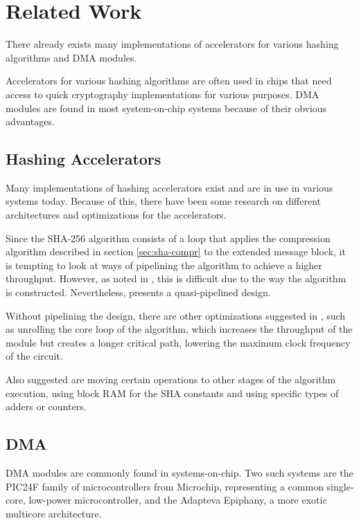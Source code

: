 \chapter{Related Work}

There already exists many implementations of accelerators for various hashing
algorithms and DMA modules.

Accelerators for various hashing algorithms are often used in chips that need
access to quick cryptography implementations for various purposes. DMA modules are
found in most system-on-chip systems because of their obvious advantages.

\section{Hashing Accelerators}
\label{sec:previous-hash}
Many implementations of hashing accelerators exist and are in use in various
systems today. Because of this, there have been some research on different
architectures and optimizations for the accelerators.

Since the SHA-256 algorithm consists of a loop that applies the compression
algorithm described in section \ref{sec:sha-compr} to the extended message
block, it is tempting to look at ways of pipelining the algorithm to achieve
a higher throughput. However, as noted in \cite{sha-opt}, this is difficult
due to the way the algorithm is constructed. Nevertheless, \cite{dadda-sha}
presents a quasi-pipelined design.

Without pipelining the design, there are other optimizations suggested in
\cite{sha-opt}, such as unrolling the core loop of the algorithm, which
increases the throughput of the module but creates a longer critical path,
lowering the maximum clock frequency of the circuit.

Also suggested are moving certain operations to other stages of the algorithm
execution, using block RAM for the SHA constants and using specific types of
adders or counters.

\section{DMA}
DMA modules are commonly found in systems-on-chip. Two such systems are the
PIC24F family of microcontrollers from Microchip, representing a common
single-core, low-power microcontroller, and the Adapteva Epiphany, a more
exotic multicore architecture.

